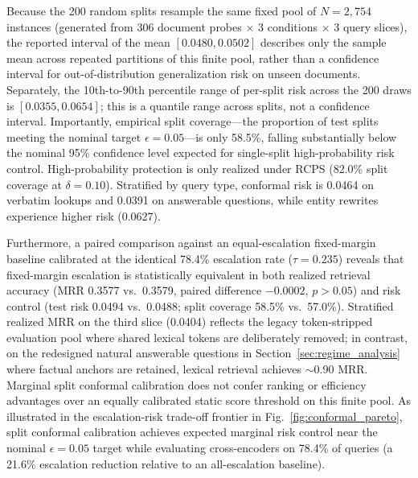 \documentclass[conference]{IEEEtran}
\begin{document}
Because the 200 random splits resample the same fixed pool of $N=2{,}754$ instances (generated from 306 document probes $\times$ 3 conditions $\times$ 3 query slices), the reported interval of the mean $[0.0480, 0.0502]$ describes only the sample mean across repeated partitions of this finite pool, rather than a confidence interval for out-of-distribution generalization risk on unseen documents. Separately, the 10th-to-90th percentile range of per-split risk across the 200 draws is $[0.0355, 0.0654]$; this is a quantile range across splits, not a confidence interval. Importantly, empirical split coverage---the proportion of test splits meeting the nominal target $\epsilon = 0.05$---is only 58.5\%, falling substantially below the nominal 95\% confidence level expected for single-split high-probability risk control. High-probability protection is only realized under RCPS (82.0\% split coverage at $\delta=0.10$). Stratified by query type, conformal risk is 0.0464 on verbatim lookups and 0.0391 on answerable questions, while entity rewrites experience higher risk (0.0627).

Furthermore, a paired comparison against an equal-escalation fixed-margin baseline calibrated at the identical 78.4\% escalation rate ($\tau = 0.235$) reveals that fixed-margin escalation is statistically equivalent in both realized retrieval accuracy (MRR 0.3577 vs.\ 0.3579, paired difference $-0.0002$, $p > 0.05$) and risk control (test risk 0.0494 vs.\ 0.0488; split coverage 58.5\% vs.\ 57.0\%). Stratified realized MRR on the third slice (0.0404) reflects the legacy token-stripped evaluation pool where shared lexical tokens are deliberately removed; in contrast, on the redesigned natural answerable questions in Section~\ref{sec:regime_analysis} where factual anchors are retained, lexical retrieval achieves $\sim$0.90 MRR. Marginal split conformal calibration does not confer ranking or efficiency advantages over an equally calibrated static score threshold on this finite pool. As illustrated in the escalation-risk trade-off frontier in Fig.~\ref{fig:conformal_pareto}, split conformal calibration achieves expected marginal risk control near the nominal $\epsilon=0.05$ target while evaluating cross-encoders on 78.4\% of queries (a 21.6\% escalation reduction relative to an all-escalation baseline).
\end{document}

